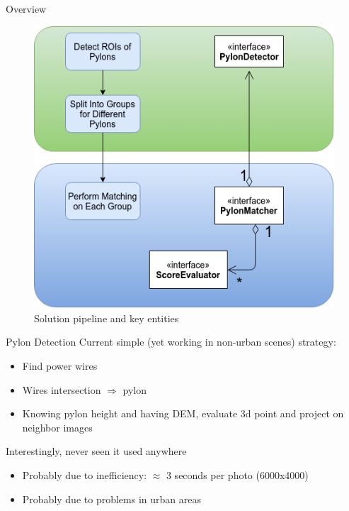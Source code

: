 \documentclass{beamer}
\begin{document}
\begin{frame}[t, fragile]{Overview}
\begin{figure}
\centering
\includegraphics[scale=0.37]{Pipeline}
\captionsetup{labelformat=empty}
\caption[a]{Solution pipeline and key entities}
\end{figure}
\end{frame}

\begin{frame}[t, fragile]{Pylon Detection}
Current simple (yet working in non-urban scenes) strategy:
\begin{itemize}
\item Find power wires
\item Wires intersection $\Rightarrow$ pylon
\item Knowing pylon height and having DEM, evaluate 3d point and project on neighbor images
\end{itemize}
Interestingly, never seen it used anywhere
\begin{itemize}
\item Probably due to inefficiency: $\approx$ 3 seconds per photo (6000x4000)
\item Probably due to problems in urban areas
\end{itemize}
\end{frame}
\end{document}
